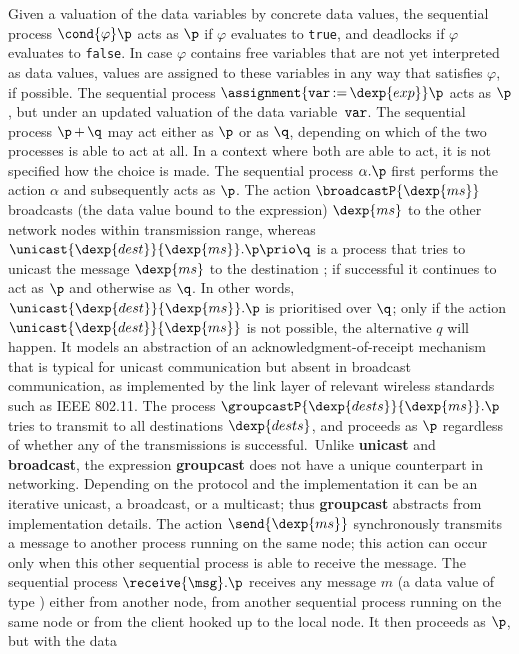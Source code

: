 \documentclass[envcountsame,envcountsect,orivec,runningheads]{llncs}
\renewcommand{\keyw}[1]{\ensuremath{{\tt #1}}}
\begin{document}
Given a valuation of the data variables by concrete data values, the
sequential process $\cond{\varphi}\p$ acts as $\p$ if $\varphi$
evaluates to {\tt true}, and deadlocks if $\varphi$ evaluates to
{\tt false}. In case $\varphi$ contains free variables that are not
yet interpreted as data values, values are assigned to these variables
in any way that satisfies $\varphi$, if possible.
The sequential process $\assignment{\keyw{var}\mathop{:=}\dexp{exp}}\p$
acts as $\p$, but under an updated valuation of the data variable~\keyw{var}.
The sequential process $\p\mathop{+}\q$ may act either as $\p$ or as
$\q$, depending on which of the two processes is able to act at all.  In a
context where both are able to act, it is not specified how the choice
is made. The sequential process $\alpha.\p$ first performs the action
$\alpha$ and subsequently acts as $\p$.  The action
$\broadcastP{\dexp{ms}}$ broadcasts (the data value bound to the
expression) $\dexp{ms}$ to the other network nodes within transmission range,
whereas $\unicast{\dexp{dest}}{\dexp{ms}}.\p \prio \q$ is a process
that tries to unicast the message $\dexp{ms}$ to the destination
; if successful it continues to act as $\p$ and otherwise
as $\q$. 
In other words,
$\unicast{\dexp{dest}}{\dexp{ms}}.\p$ is prioritised over $\q$;
only if the action $\unicast{\dexp{dest}}{\dexp{ms}}$ is not possible,
the alternative $q$ will happen.
It models an abstraction of an acknowledgment-of-receipt mechanism
that is typical for unicast communication but absent in broadcast communication, as implemented by the link
layer of relevant wireless standards such as IEEE 802.11.
The process $\groupcastP{\dexp{dests}}{\dexp{ms}}.\p$ tries
to transmit  to all destinations $\dexp{dests}$, and proceeds
as $\p$ regardless of whether any of the transmissions is successful.\
Unlike {\bf unicast} and  {\bf broadcast}, the expression {\bf groupcast} 
does not have a unique counterpart in networking.
Depending on the protocol and the implementation it can 
be an iterative unicast, a broadcast, or a multicast;
thus  {\bf groupcast} abstracts from implementation details.
The action $\send{\dexp{ms}}$ synchronously transmits a message to another
process running on the same node; this action can occur only when this
other sequential process is able to receive the message.  The
sequential process $\receive{\msg}.\p$ receives any message $m$ (a
data value of type \tMSG) either from another node, from another
sequential process running on the same node or from the client hooked
up to the local node.  It then proceeds as $\p$, but with the data
\end{document}
